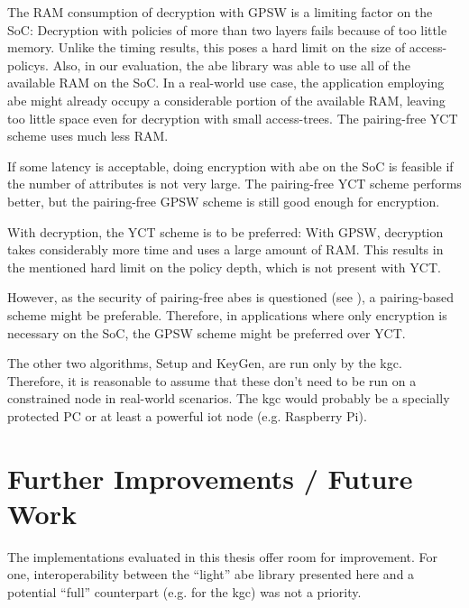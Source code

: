 The RAM consumption of decryption with GPSW is a limiting factor on the SoC:
Decryption with policies of more than two layers fails because of too little memory.
Unlike the timing results, this poses a hard limit on the size of \glspl{access-policy}.
Also, in our evaluation, the \acrshort{abe} library was able to use all of the available RAM on the SoC.
In a real-world use case, the application employing \acrshort{abe} might already occupy a considerable portion of the available RAM, leaving too little space even for decryption with small \glspl{access-tree}.
The pairing-free YCT scheme uses much less RAM.

If some latency is acceptable, doing encryption with \acrshort{abe} on the SoC is feasible if the number of attributes is not very large.
The pairing-free YCT scheme performs better, but the pairing-free GPSW scheme is still good enough for encryption.

With decryption, the YCT scheme is to be preferred:
With GPSW, decryption takes considerably more time and uses a large amount of RAM.
This results in the mentioned hard limit on the policy depth, which is not present with YCT.

However, as the security of pairing-free \acrshort{abes} is questioned (see \cite{herranz_attacking_2020}), a pairing-based scheme might be preferable.
Therefore, in applications where only encryption is necessary on the SoC, the GPSW scheme might be preferred over YCT.

The other two algorithms, Setup and KeyGen, are run only by the \acrshort{kgc}.
Therefore, it is reasonable to assume that these don't need to be run on a constrained node in real-world scenarios.
The \acrshort{kgc} would probably be a specially protected PC or at least a powerful \acrshort{iot} node (e.g. Raspberry Pi).

\section{Further Improvements / Future Work}

The implementations evaluated in this thesis offer room for improvement.
For one, interoperability between the ``light'' \acrshort{abe} library presented here and a potential ``full'' counterpart (e.g. for the \acrshort{kgc}) was not a priority.

